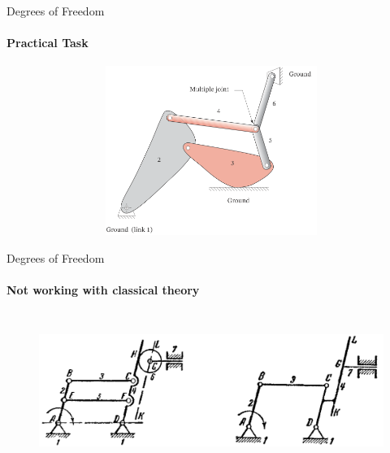 \documentclass[aspectratio=169]{beamer}
\begin{document}
\begin{frame}[t]{Degrees of Freedom}
    \framesubtitle{Practical Task}
    \vspace{-0.7cm}
    \begin{figure}[H]
        \centering\includegraphics[height=5.5cm,width=1\textwidth,keepaspectratio]{stud_task.png}
        \caption*{}
        \label{fig:stud_task.png}
    \end{figure}        
    \end{frame}

    
\begin{frame}[t]{Degrees of Freedom}
    \framesubtitle{Not working with classical theory}
    \vspace{-0.5cm}
        \begin{figure}[H]
            \centering\includegraphics[height=5cm,width=1\textwidth,keepaspectratio]{extra_links_mech.png}
            \label{fig:extra_links_mech.png}
        \end{figure}
    \end{frame}
\end{document}
